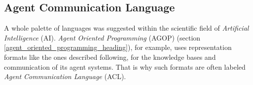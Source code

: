 %
%
%
%
%
%
%

\subsection{Agent Communication Language}
\label{agent_communication_language_heading}

A whole palette of languages was suggested within the scientific field of
\emph{Artificial Intelligence} (AI). \emph{Agent Oriented Programming} (AGOP)
(section \ref{agent_oriented_programming_heading}), for example, uses
representation formats like the ones described following, for the knowledge
bases and communication of its agent systems. That is why such formats are
often labeled \emph{Agent Communication Language} (ACL).




%
